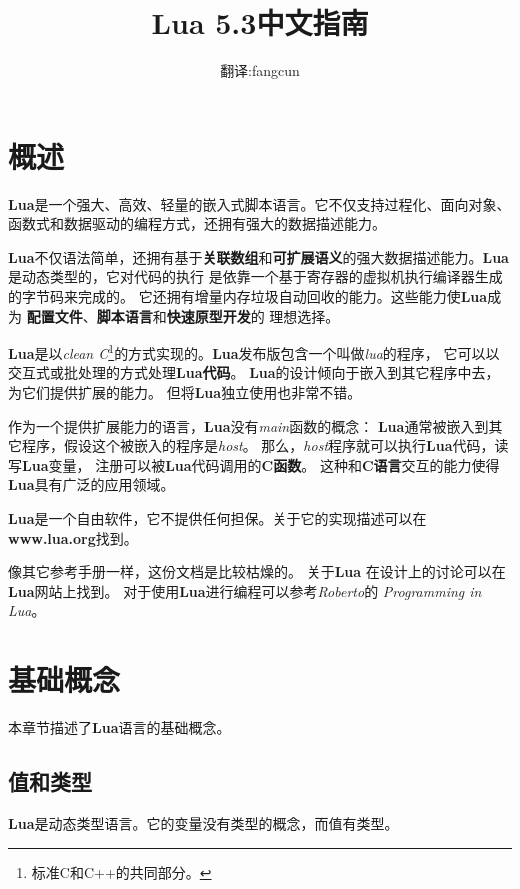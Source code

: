 \documentclass{ctexart}
\title{Lua 5.3中文指南}
\author{翻译:fangcun}
\begin{document}
\maketitle
\newpage
\tableofcontents
\newpage
\section{概述}

\textbf{Lua}是一个强大、高效、轻量的嵌入式脚本语言。它不仅支持过程化、面向对象、函数式和数据驱动的编程方式，还拥有强大的数据描述能力。

\textbf{Lua}不仅语法简单，还拥有基于\textbf{关联数组}和\textbf{可扩展语义}的强大数据描述能力。\textbf{Lua}是动态类型的，它对代码的执行
是依靠一个基于寄存器的虚拟机执行编译器生成的字节码来完成的。
它还拥有增量内存垃圾自动回收的能力。这些能力使\textbf{Lua}成为
\textbf{配置文件}、\textbf{脚本语言}和\textbf{快速原型开发}的
理想选择。

\textbf{Lua}是以\emph{clean C}\footnote{标准C和C++的共同部分。
}的方式实现的。\textbf{Lua}发布版包含一个叫做\emph{lua}的程序，
它可以以交互式或批处理的方式处理\textbf{Lua代码}。
\textbf{Lua}的设计倾向于嵌入到其它程序中去，为它们提供扩展的能力。
但将\textbf{Lua}独立使用也非常不错。

作为一个提供扩展能力的语言，\textbf{Lua}没有\emph{main}函数的概念：
\textbf{Lua}通常被嵌入到其它程序，假设这个被嵌入的程序是\emph{host}。
那么，\emph{host}程序就可以执行\textbf{Lua}代码，读写\textbf{Lua}变量，
注册可以被\textbf{Lua}代码调用的\textbf{C函数}。
这种和\textbf{C语言}交互的能力使得\textbf{Lua}具有广泛的应用领域。

\textbf{Lua}是一个自由软件，它不提供任何担保。关于它的实现描述可以在
\textbf{www.lua.org}找到。

像其它参考手册一样，这份文档是比较枯燥的。
关于\textbf{Lua}
在设计上的讨论可以在\textbf{Lua}网站上找到。
对于使用\textbf{Lua}进行编程可以参考\emph{Roberto}的
\emph{Programming in Lua}。

\section{基础概念}

本章节描述了\textbf{Lua}语言的基础概念。 

\subsection{值和类型}

\textbf{Lua}是动态类型语言。它的变量没有类型的概念，而值有类型。
\end{document}
